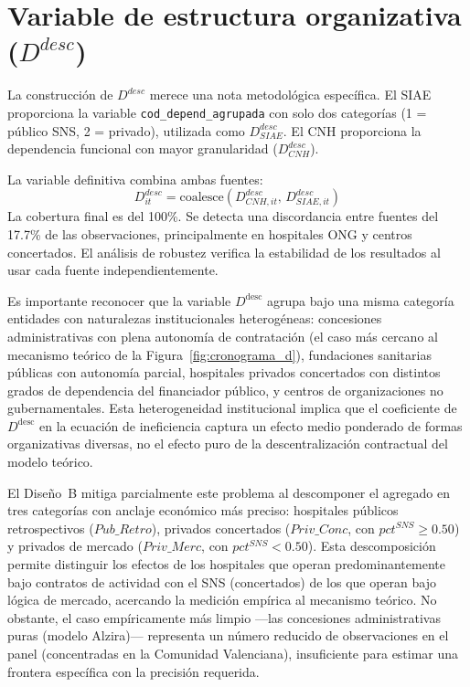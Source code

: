 \section{Variable de estructura organizativa (\texorpdfstring{$D^{desc}$}{D\^{}desc})}

La construcción de $D^{desc}$ merece una nota metodológica específica. El SIAE proporciona la variable \texttt{cod\_depend\_agrupada} con solo dos categorías (1 = público SNS, 2 = privado), utilizada como $D^{desc}_{SIAE}$. El CNH proporciona la dependencia funcional con mayor granularidad ($D^{desc}_{CNH}$).

La variable definitiva combina ambas fuentes:
\begin{equation}
  D^{desc}_{it} = \text{coalesce}(D^{desc}_{CNH,it},\, D^{desc}_{SIAE,it})
\end{equation}
La cobertura final es del 100\%. Se detecta una discordancia entre fuentes del 17.7\% de las observaciones, principalmente en hospitales ONG y centros concertados. El análisis de robustez verifica la estabilidad de los resultados al usar cada fuente independientemente.

Es importante reconocer que la variable $D^{\text{desc}}$ agrupa bajo una misma categoría entidades con naturalezas institucionales heterogéneas: concesiones administrativas con plena autonomía de contratación (el caso más cercano al mecanismo teórico de la Figura~\ref{fig:cronograma_d}), fundaciones sanitarias públicas con autonomía parcial, hospitales privados concertados con distintos grados de dependencia del financiador público, y centros de organizaciones no gubernamentales. Esta heterogeneidad institucional implica que el coeficiente de $D^{\text{desc}}$ en la ecuación de ineficiencia captura un efecto medio ponderado de formas organizativas diversas, no el efecto puro de la descentralización contractual del modelo teórico.

El Diseño~B mitiga parcialmente este problema al descomponer el agregado en tres categorías con anclaje económico más preciso: hospitales públicos retrospectivos ($Pub\_Retro$), privados concertados ($Priv\_Conc$, con $pct^{SNS} \geq 0.50$) y privados de mercado ($Priv\_Merc$, con $pct^{SNS} < 0.50$). Esta descomposición permite distinguir los efectos de los hospitales que operan predominantemente bajo contratos de actividad con el SNS (concertados) de los que operan bajo lógica de mercado, acercando la medición empírica al mecanismo teórico. No obstante, el caso empíricamente más limpio ---las concesiones administrativas puras (modelo Alzira)--- representa un número reducido de observaciones en el panel (concentradas en la Comunidad Valenciana), insuficiente para estimar una frontera específica con la precisión requerida.


